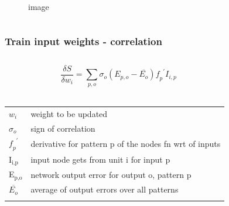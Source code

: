 \documentclass[presentation]{beamer}
\begin{document}
\begin{frame}
\begin{columns}[t]
\begin{column}{0.5\textwidth}
\begin{figure}
        \caption{image}
      \end{figure}			
		\end{column}
	\end{columns}
\end{frame}


\begin{frame}
  \frametitle{Train input weights - correlation}
	\begin{columns}[t]
		\begin{column}{0.5\textwidth}
      $$ \frac{\delta S}{\delta w_{i}} = \sum_{p,o} \sigma_{o}(E_{p,o} - \overline{E_{o}}) \mathit{f_{p}}^{\prime} I_{i,p} $$
     \\ 
      \begin{center}
        \begin{tabular}{ll}
          \(\mathit{w_{i}}\) & \tiny{weight to be updated}  \\
          \(\sigma_{o}\) & \tiny{sign of correlation}  \\
          \(\mathit{f_{p}}^{\prime}\) & \tiny{derivative for pattern p of the nodes fn wrt of inputs} \\
          I\(_{\text{i,p}}\) & \tiny{input node gets from unit i for input p}  \\
          E\(_{\text{p,o}}\) & \tiny{network output error for output o, pattern p} \\
          \(\overline{E_{o}}\) & \tiny{average of output errors over all patterns} \\
          & \\
        \end{tabular}
      \end{center}
		\end{column}
		\begin{column}{0.5\textwidth}
      \begin{figure}
        \centering

\end{figure}
\end{column}
\end{columns}
\end{frame}
\end{document}
